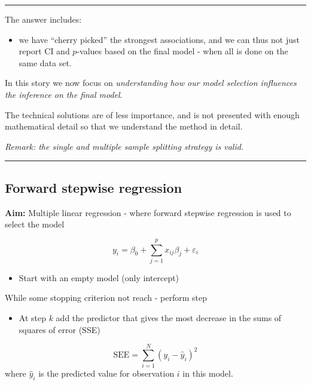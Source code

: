 \documentclass[
  letterpaper,
  DIV=11,
  numbers=noendperiod]{scrartcl}
\providecommand{\tightlist}{%
  \setlength{\itemsep}{0pt}\setlength{\parskip}{0pt}}\usepackage{longtable,booktabs,array}
\begin{document}
\begin{center}\rule{0.5\linewidth}{0.5pt}\end{center}

The answer includes:

\begin{itemize}
\tightlist
\item
  we have ``cherry picked'' the strongest associations, and we can thus
  not just report CI and \(p\)-values based on the final model - when
  all is done on the same data set.
\end{itemize}

In this story we now focus on \emph{understanding how our model
selection influences the inference on the final model}.

The technical solutions are of less importance, and is not presented
with enough mathematical detail so that we understand the method in
detail.

\emph{Remark: the single and multiple sample splitting strategy is
valid.}

\begin{center}\rule{0.5\linewidth}{0.5pt}\end{center}

\hypertarget{forward-stepwise-regression}{%
\subsection{Forward stepwise
regression}\label{forward-stepwise-regression}}

\textbf{Aim:} Multiple linear regression - where forward stepwise
regression is used to select the model

\[y_i=\beta_0+\sum_{j=1}^p x_{ij}\beta_j + \varepsilon_i\]

\begin{itemize}
\tightlist
\item
  Start with an empty model (only intercept)
\end{itemize}

While some stopping criterion not reach - perform step

\begin{itemize}
\tightlist
\item
  At step \(k\) add the predictor that gives the most decrease in the
  sums of squares of error (SSE)
\end{itemize}

\[ \text{SEE}=\sum_{i=1}^N (y_i -\hat{y}_i)^2\] where \(\hat{y}_i\) is
the predicted value for observation \(i\) in this model.
\end{document}
